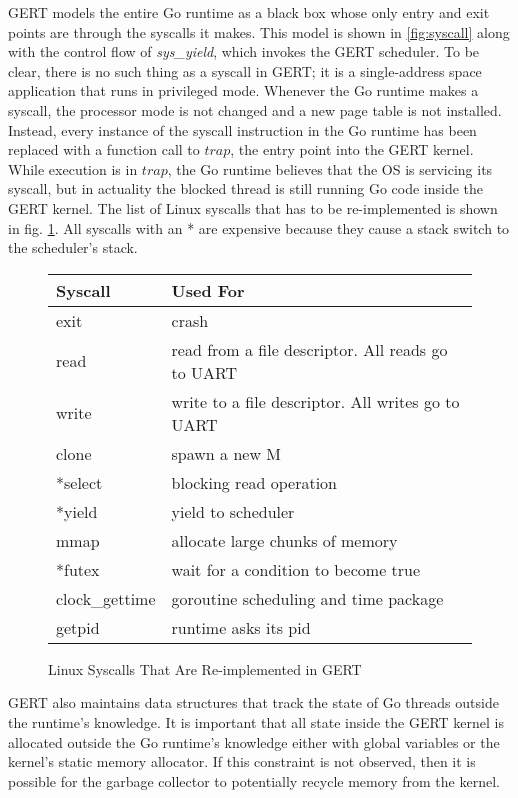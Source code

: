 GERT models the entire Go runtime as a black box whose only entry and exit points
are through the syscalls it makes. This model is shown in \ref{fig:syscall} along with the
control flow of \textit{sys\_yield}, which invokes the GERT scheduler. To be clear, there is no such thing as a syscall in GERT;
it is a single-address space application that runs in privileged mode.
Whenever the Go runtime makes a syscall, the processor mode is not changed and a new page table
is not installed. Instead, every instance of the syscall instruction in the Go runtime has been
replaced with a function call to $trap$, the entry point into the GERT kernel.
While execution is in $trap$, the Go runtime believes
that the OS is servicing its syscall, but in actuality the blocked thread is still running Go code inside
the GERT kernel. The list of Linux syscalls that has to be re-implemented is shown in fig. \ref{fig:syscalls}.
All syscalls with an * are expensive because they cause a stack switch to the scheduler's stack.


\begin{figure} [h]
\begin{center}
  \begin{tabular}{ | l | l |}
    \hline
    Syscall & Used For \\ \hline
    exit & crash \\ \hline
    read & read from a file descriptor. All reads go to UART\\ \hline
    write & write to a file descriptor. All writes go to UART\\ \hline
    clone & spawn a new M\\ \hline
    *select & blocking read operation\\ \hline
    *yield & yield to scheduler\\ \hline
    mmap & allocate large chunks of memory\\ \hline
    *futex & wait for a condition to become true\\ \hline
    clock\_gettime & goroutine scheduling and time package\\ \hline
    getpid & runtime asks its pid\\ \hline
  \end{tabular}
\end{center}
  \caption{Linux Syscalls That Are Re-implemented in GERT}  \label{fig:syscalls}
\end{figure}

GERT also maintains data structures that track the state of Go threads
outside the runtime's knowledge. It is important that all state inside the GERT kernel is
allocated outside the Go runtime's knowledge either with global variables or the kernel's
static memory allocator. If this constraint is not observed, then it is possible for the garbage collector
to potentially recycle memory from the kernel.

